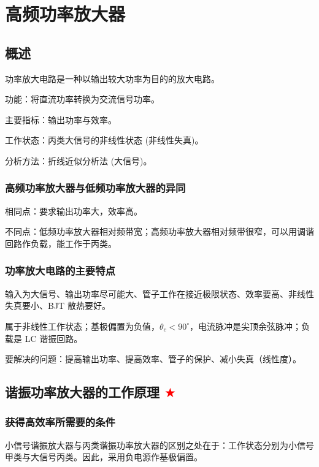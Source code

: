 \chapter{高频功率放大器}

\section{概述}

功率放大电路是一种以输出较大功率为目的的放大电路。

功能：将直流功率转换为交流信号功率。

主要指标：输出功率与效率。

工作状态：丙类大信号的非线性状态 (非线性失真)。

分析方法：折线近似分析法 (大信号)。

\subsection{高频功率放大器与低频功率放大器的异同}

相同点：要求输出功率大，效率高。

不同点：低频功率放大器相对频带宽；高频功率放大器相对频带很窄，可以用调谐回路作负载，能工作于丙类。

\subsection{功率放大电路的主要特点}

输入为大信号、输出功率尽可能大、管子工作在接近极限状态、效率要高、非线性失真要小、BJT 散热要好。

属于非线性工作状态；基极偏置为负值，$\theta_c < 90^\circ$，电流脉冲是尖顶余弦脉冲；负载是 LC 谐振回路。

要解决的问题：提高输出功率、提高效率、管子的保护、减小失真（线性度）。

\section{谐振功率放大器的工作原理 \textcolor{red}{$\bigstar$}}

\subsection{获得高效率所需要的条件}

小信号谐振放大器与丙类谐振功率放大器的区别之处在于：工作状态分别为小信号甲类与大信号丙类。因此，采用负电源作基极偏置。

